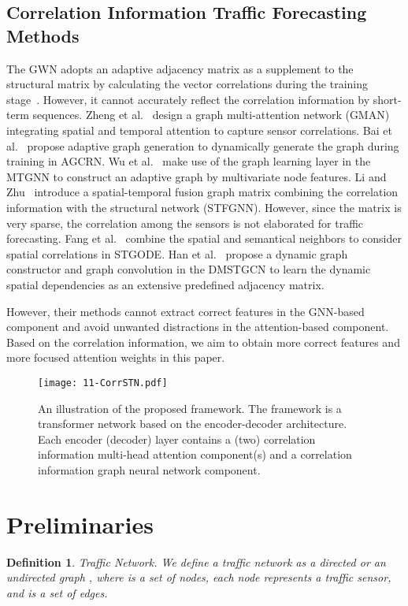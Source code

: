\documentclass[sn-mathphys,iicol]{sn-jnl}
\newtheorem{defi}{Definition}
\theoremstyle{thmstyleone}\newtheorem{theorem}{Theorem}\newtheorem{proposition}[theorem]{Proposition}
\theoremstyle{thmstyletwo}\newtheorem{example}{Example}\newtheorem{remark}{Remark}
\theoremstyle{thmstylethree}\newtheorem{definition}{Definition}
\begin{document}
\subsection{Correlation Information Traffic Forecasting Methods}
The GWN adopts an adaptive adjacency matrix as a supplement to the structural matrix by calculating the vector correlations during the training stage~\cite{Wu:2019}. However, it cannot accurately reflect the correlation information by short-term sequences. 
Zheng et al.~\cite{Zheng.2020} design a graph multi-attention network (GMAN) integrating spatial and temporal attention to capture sensor correlations. 
Bai et al.~\cite{Bai:2020} propose adaptive graph generation to dynamically generate the graph during training in AGCRN.
Wu et al.~\cite{Wu:2020} make use of the graph learning layer in the MTGNN to construct an adaptive graph by multivariate node features.
Li and Zhu~\cite{Li_Zhu_2021} introduce a spatial-temporal fusion graph matrix combining the correlation information with the structural network (STFGNN). However, since the matrix is very sparse, the correlation among the sensors is not elaborated for traffic forecasting.
Fang et al.~\cite{Fang:2021} combine the spatial and semantical neighbors to consider spatial correlations in STGODE.
Han et al.~\cite{Han:2021} propose a dynamic graph constructor and graph convolution in the DMSTGCN to learn the dynamic spatial dependencies as an extensive predefined adjacency matrix.

However, their methods cannot extract correct features in the GNN-based component and avoid unwanted distractions in the attention-based component. Based on the correlation information, we aim to obtain more correct features and more focused attention weights in this paper.

\begin{figure*}[t]
\centering
\texttt{[image: 11-CorrSTN.pdf]}
\caption{An illustration of the proposed framework. The framework is a transformer network based on the encoder-decoder architecture. Each encoder (decoder) layer contains a (two) correlation information multi-head attention component(s) and a correlation information graph neural network component.}
\label{fig:model}
\end{figure*}

\section{Preliminaries}\label{sec:preliminary}
\begin{defi}
Traffic Network. We define a traffic network as a directed or an undirected graph , where  is a set of  nodes, each node represents a traffic sensor, and  is a set of edges.
\end{defi}
\end{document}
